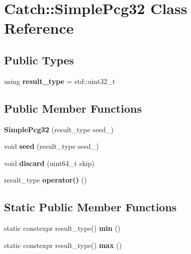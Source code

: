 \hypertarget{classCatch_1_1SimplePcg32}{}\section{Catch\+:\+:Simple\+Pcg32 Class Reference}
\label{classCatch_1_1SimplePcg32}
\subsection*{Public Types}
\begin{DoxyCompactItemize}
\item 
\mbox{\label{classCatch_1_1SimplePcg32_a220ca38f6d16804c6e99937a673ec3ff}} 
using {\bfseries result\+\_\+type} = std\+::uint32\+\_\+t
\end{DoxyCompactItemize}
\subsection*{Public Member Functions}
\begin{DoxyCompactItemize}
\item 
\mbox{\label{classCatch_1_1SimplePcg32_a901fc48d250c3d92b1ec067bcc6155c1}} 
{\bfseries Simple\+Pcg32} (result\+\_\+type seed\+\_\+)
\item 
\mbox{\label{classCatch_1_1SimplePcg32_a215dac93c384973353a2b4f87f68c8bc}} 
void {\bfseries seed} (result\+\_\+type seed\+\_\+)
\item 
\mbox{\label{classCatch_1_1SimplePcg32_a877e7a9c14d378af729ad19a0e959178}} 
void {\bfseries discard} (uint64\+\_\+t skip)
\item 
\mbox{\label{classCatch_1_1SimplePcg32_acda21743a5ac46fdff9a0b4a6d45a91f}} 
result\+\_\+type {\bfseries operator()} ()
\end{DoxyCompactItemize}
\subsection*{Static Public Member Functions}
\begin{DoxyCompactItemize}
\item 
\mbox{\label{classCatch_1_1SimplePcg32_a388575137fa70bb32a367a5ad59f2a46}} 
static constexpr result\+\_\+type() {\bfseries min} ()
\item 
\mbox{\label{classCatch_1_1SimplePcg32_a282cfed1bcba2ae23f242913489195af}} 
static constexpr result\+\_\+type() {\bfseries max} ()
\end{DoxyCompactItemize}
